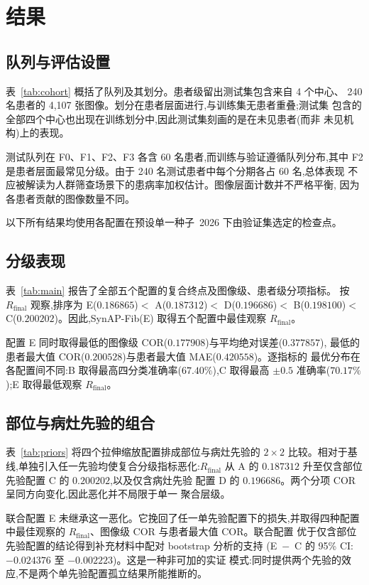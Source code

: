 \section{结果}
\label{sec:results}

\subsection{队列与评估设置}

表~\ref{tab:cohort} 概括了队列及其划分。患者级留出测试集包含来自 4 个中心、
240 名患者的 4,107 张图像。划分在患者层面进行,与训练集无患者重叠;测试集
包含的全部四个中心也出现在训练划分中,因此测试集刻画的是在未见患者(而非
未见机构)上的表现。

测试队列在 F0、F1、F2、F3 各含 60 名患者,而训练与验证遵循队列分布,其中
F2 是患者层面最常见分级。由于 240 名测试患者中每个分期各占 60 名,总体表现
不应被解读为人群筛查场景下的患病率加权估计。图像层面计数并不严格平衡,
因为各患者贡献的图像数量不同。

以下所有结果均使用各配置在预设单一种子~2026 下由验证集选定的检查点。

\subsection{分级表现}

表~\ref{tab:main} 报告了全部五个配置的复合终点及图像级、患者级分项指标。
按 $R_{\mathrm{final}}$ 观察,排序为 E($0.186865$)$<$ A($0.187312$)$<$
D($0.196686$)$<$ B($0.198100$)$<$ C($0.200202$)。因此,SynAP-Fib(E)
取得五个配置中最佳观察 $R_{\mathrm{final}}$。

配置 E 同时取得最低的图像级 COR($0.177908$)与平均绝对误差($0.377857$),
最低的患者最大值 COR($0.200528$)与患者最大值 MAE($0.420558$)。逐指标的
最优分布在各配置间不同:B 取得最高四分类准确率($67.40\%$),C 取得最高
$\pm0.5$ 准确率($70.17\%$);E 取得最低观察 $R_{\mathrm{final}}$。

\subsection{部位与病灶先验的组合}

表~\ref{tab:priors} 将四个拉伸缩放配置排成部位与病灶先验的 $2\times2$
比较。相对于基线,单独引入任一先验均使复合分级指标恶化:$R_{\mathrm{final}}$
从 A 的 $0.187312$ 升至仅含部位先验配置 C 的 $0.200202$,以及仅含病灶先验
配置 D 的 $0.196686$。两个分项 COR 呈同方向变化,因此恶化并不局限于单一
聚合层级。

联合配置 E 未继承这一恶化。它挽回了任一单先验配置下的损失,并取得四种配置
中最佳观察的 $R_{\mathrm{final}}$、图像级 COR 与患者最大值 COR。联合配置
优于仅含部位先验配置的结论得到补充材料中配对 bootstrap 分析的支持
(E~$-$~C 的 95\% CI:$-0.024376$ 至 $-0.002223$)。这是一种非可加的实证
模式:同时提供两个先验的效应,不是两个单先验配置孤立结果所能推断的。

